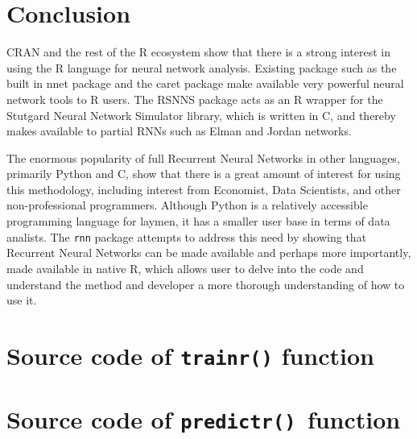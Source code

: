 \documentclass[british]{article}\usepackage[]{graphicx}\usepackage[]{color}
\newcommand{\code}[1]{\texttt{#1}}
\begin{document}
\section{Conclusion}

CRAN and the rest of the R ecosystem show that there is a strong interest
in using the R language for neural network analysis. Existing package
such as the built in nnet package and the caret package make available
very powerful neural network tools to R users. The RSNNS package acts
as an R wrapper for the Stutgard Neural Network Simulator library,
which is written in C, and thereby makes available to partial RNNs
such as Elman and Jordan networks.

The enormous popularity of full Recurrent Neural Networks in other
languages, primarily Python and C, show that there is a great amount
of interest for using this methodology, including interest from Economist,
Data Scientists, and other non-professional programmers. Although
Python is a relatively accessible programming language for laymen,
it has a smaller user base in terms of data analists. The \code{rnn}
package attempts to address this need by showing that Recurrent Neural
Networks can be made available and perhaps more importantly, made
available in native R, which allows user to delve into the code and
understand the method and developer a more thorough understanding
of how to use it.

\pagebreak{}

\appendix

\section{Source code of \protect\code{trainr()} function}




\section{Source code of \protect\code{predictr() }function}


\end{document}
